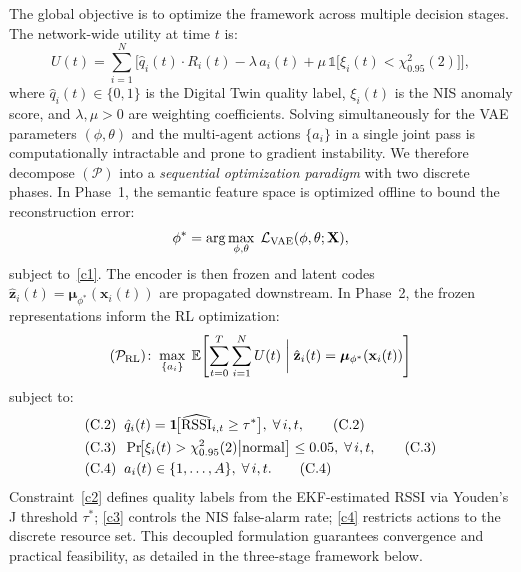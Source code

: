 \documentclass[conference]{IEEEtran}
\begin{document}
The global objective is to optimize the framework across multiple decision
stages. The network-wide utility at time $t$ is:
\begin{equation}
U(t) = \sum_{i=1}^{N}\bigl[
  \hat{q}_i(t)\cdot R_i(t) - \lambda\, a_i(t)
  + \mu\,\mathbb{1}\!\bigl[\xi_i(t) < \chi^2_{0.95}(2)\bigr]
\bigr],
\label{eq:utility}
\end{equation}
where $\hat{q}_i(t)\in\{0,1\}$ is the Digital Twin quality label,
$\xi_i(t)$ is the NIS anomaly score, and $\lambda,\mu>0$ are weighting
coefficients. Solving simultaneously for the VAE parameters $(\phi,\theta)$
and the multi-agent actions $\{a_i\}$ in a single joint pass is
computationally intractable and prone to gradient instability. We therefore
decompose $(\mathcal{P})$ into a \textit{sequential optimization paradigm}
with two discrete phases. In Phase~1, the semantic feature space is
optimized offline to bound the reconstruction error:
\begin{equation}
\phi^* = \arg\max_{\phi,\theta}\;\mathcal{L}_{\rm VAE}(\phi,\theta;\mathbf{X}),
\label{eq:vae_opt}
\end{equation}
subject to~\eqref{c1}. The encoder is then frozen and latent codes
$\hat{\mathbf{z}}_i(t)=\bm{\mu}_{\phi^*}(\mathbf{x}_i(t))$ are propagated
downstream. In Phase~2, the frozen representations inform the RL
optimization:
\begin{equation}
(\mathcal{P}_{\rm RL})\!:\;\max_{\{a_i\}}\;
  \mathbb{E}\!\left[\sum_{t=0}^{T}\sum_{i=1}^{N} U(t)
  \;\bigg|\;
  \hat{\mathbf{z}}_i(t)=\bm{\mu}_{\phi^*}(\mathbf{x}_i(t))\right]
\label{eq:rl_opt}
\end{equation}
subject to:
\begin{align}
&\text{(C.2)}\;\; \hat{q}_i(t) = \mathbf{1}\!\bigl[\widehat{\rm RSSI}_{i,t}\geq\tau^*\bigr],
\;\forall\, i,t,\tag{C.2}\label{c2}\\
&\text{(C.3)}\;\; \Pr\!\bigl[\xi_i(t)>\chi^2_{0.95}(2)\big|\text{normal}\bigr]
\leq 0.05,\;\forall\, i,t,\tag{C.3}\label{c3}\\
&\text{(C.4)}\;\; a_i(t)\in\{1,\ldots,A\},\;\forall\, i,t.\tag{C.4}\label{c4}
\end{align}
Constraint~\eqref{c2} defines quality labels from the EKF-estimated RSSI
via Youden's J threshold $\tau^*$; \eqref{c3} controls the NIS false-alarm
rate; \eqref{c4} restricts actions to the discrete resource set. This
decoupled formulation guarantees convergence and practical feasibility,
as detailed in the three-stage framework below.

\end{document}
